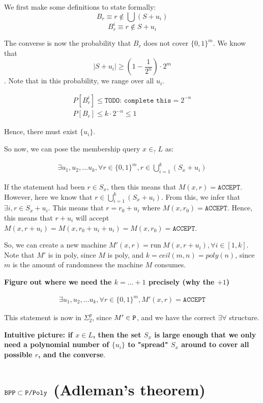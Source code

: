 We first make some definitions to state formally: 
$$B_r \equiv r \notin \bigcup (S + u_i)$$
 $$B_r^i \equiv r \notin S + u_i$$

The converse is now the probability that $B_r$ does not cover $\{0, 1\}^m$.  
We know that $$|S + u_i| \geq (1 - \frac{1}{2^n}) \cdot 2^m$$.
Note that in this probability, we range over all $u_i$.

\begin{align*}
    P[B_r^i] \leq \texttt{TODO: complete this} = 2^{-n} \\
    P[B_r] \leq  k \cdot 2^{-n} \leq 1
\end{align*}

Hence, there must exist $\{ u_i \}$.


So now, we can pose the membership query $x \in_? L$ as:

\begin{align*}
    \exists u_1, u_2, \dots u_k, \forall r \in \{0, 1\}^m, r \in \bigcup_{i = 1}^k (S_x + u_i)
\end{align*}

If the statement had been $r \in S_x$, then this means that $M(x, r) = \texttt{ACCEPT}$.
However, here we know that $r \in \bigcup_{i = 1}^k (S_x + u_i)$. From this, 
we infer that $\exists i, r \in S_x + u_i$.  This means
that $r = r_0 + u_i$ where $M(x, r_0) = \texttt{ACCEPT}$. Hence, this means
that $r + u_i$ will accept $M(x, r + u_i) = M(x, r_0 + u_i + u_i) = M(x, r_0) = \texttt{ACCEPT}$.

So, we can create a new machine $M'(x, r) = \text{run}~M(x, r + u_i),  \forall i \in [1, k]$.
Note that $M'$ is in poly, since $M$ is poly, and $k = ceil(m, n) = poly(n)$, since
$m$ is the amount of randomness the machine $M$ consumes.

\textbf{Figure out where we need the $k = \dots + 1$ precisely (why the $+1$)}

\begin{align*}
    \exists u_1, u_2, \dots u_k, \forall r \in \{0, 1\}^m, M'(x, r) = \texttt{ACCEPT}
\end{align*}

This statement is now in $\Sigma_2^p$, since $M' \in \texttt{P}$, and we have the correct
$\exists \forall$ structure.


\textbf{Intuitive picture: if $x \in L$, then the set $S_x$ is large enough that we
only need a polynomial number of $\{u_i\}$ to "spread" $S_x$ around to cover all
possible $r$, and the converse}.

\section{$\texttt{BPP} \subset \texttt{P/Poly}$ (Adleman's theorem)}
